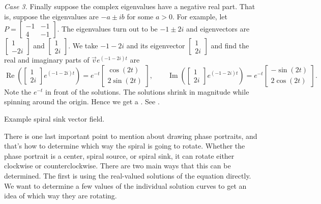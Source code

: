 \emph{Case 3.} Finally suppose the complex eigenvalues have a negative real
part.  That is, suppose the eigenvalues are $-a \pm ib$ for some $a > 0$.
For example, let $P = 
\left[ \begin{smallmatrix} -1 & -1 \\ 4 & -1 \end{smallmatrix} \right]$.
The eigenvalues turn out to be $-1\pm 2i$ and eigenvectors are
$\left[ \begin{smallmatrix} 1 \\ -2i \end{smallmatrix} \right]$ and
$\left[ \begin{smallmatrix} 1 \\ 2i \end{smallmatrix} \right]$.  We take
$-1 - 2i$ and its eigenvector
$\left[ \begin{smallmatrix} 1 \\ 2i \end{smallmatrix} \right]$ and find
the real and imaginary parts of
$\vec{v} e^{(-1-2i)t}$ are
\begin{equation*}
\operatorname{Re}\left(
\begin{bmatrix} 1 \\ 2i \end{bmatrix} e^{(-1-2i)t}\right) =
e^{-t}
\begin{bmatrix} \cos (2t) \\ 2 \sin (2t)  \end{bmatrix} ,
\qquad
\operatorname{Im}\left(
\begin{bmatrix} 1 \\ 2i \end{bmatrix} e^{(-1-2i)t}\right) =
e^{-t}
\begin{bmatrix} -\sin (2t) \\ 2 \cos (2t) \end{bmatrix} .
\end{equation*}
Note the $e^{-t}$ in front of the solutions.  The solutions
shrink in magnitude while spinning around the origin.  Hence we get
a \emph{}.
See .

\begin{myfig}
\capstart
{}
\caption{Example spiral sink vector field.\label{pln:spiral-sinkfig}}
\end{myfig}

There is one last important point to mention about drawing phase portraits, and that's how to determine which way the spiral is going to rotate. Whether the phase portrait is a center, spiral source, or spiral sink, it can rotate either clockwise or counterclockwise. There are two main ways that this can be determined. The first is using the real-valued solutions of the equation directly. We want to determine a few values of the individual solution curves to get an idea of which way they are rotating.

